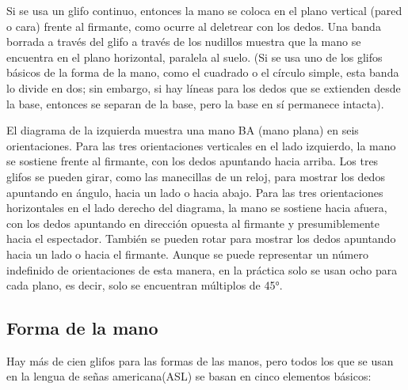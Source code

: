 Si se usa un glifo continuo, entonces la mano se coloca en el plano vertical (pared o cara) frente al firmante, como ocurre al deletrear con los dedos. Una banda borrada a través del glifo a través de los nudillos muestra que la mano se encuentra en el plano horizontal, paralela al suelo. (Si se usa uno de los glifos básicos de la forma de la mano, como el cuadrado o el círculo simple, esta banda lo divide en dos; sin embargo, si hay líneas para los dedos que se extienden desde la base, entonces se separan de la base, pero la base en sí permanece intacta). 

El diagrama de la izquierda muestra una mano BA (mano plana) en seis orientaciones. Para las tres orientaciones verticales en el lado izquierdo, la mano se sostiene frente al firmante, con los dedos apuntando hacia arriba. Los tres glifos se pueden girar, como las manecillas de un reloj, para mostrar los dedos apuntando en ángulo, hacia un lado o hacia abajo. Para las tres orientaciones horizontales en el lado derecho del diagrama, la mano se sostiene hacia afuera, con los dedos apuntando en dirección opuesta al firmante y presumiblemente hacia el espectador. También se pueden rotar para mostrar los dedos apuntando hacia un lado o hacia el firmante. Aunque se puede representar un número indefinido de orientaciones de esta manera, en la práctica solo se usan ocho para cada plano, es decir, solo se encuentran múltiplos de 45°.

\subsection{Forma de la mano}\label{subsection:state-of-the-art:sl:handshape}
Hay más de cien glifos para las formas de las manos, pero todos los que se usan en la lengua de señas americana(ASL) se basan en cinco elementos básicos:

